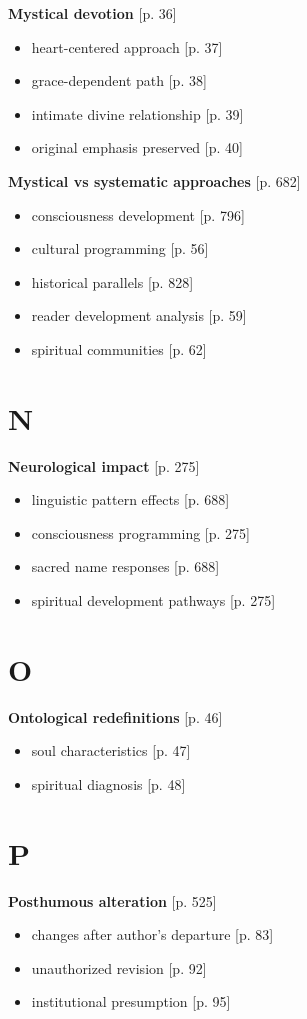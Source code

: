 \documentclass[11pt,twoside]{book}
\begin{document}
\textbf{\textbf{Mystical devotion}} {[}p. 36]
\begin{itemize}
\item heart-centered approach [p. 37]
\item grace-dependent path [p. 38]
\item intimate divine relationship [p. 39]
\item original emphasis preserved [p. 40]
\end{itemize}

\textbf{\textbf{Mystical vs systematic approaches}} {[}p. 682]
\begin{itemize}
\item consciousness development [p. 796]
\item cultural programming [p. 56]
\item historical parallels [p. 828]
\item reader development analysis [p. 59]
\item spiritual communities [p. 62]
\end{itemize}
\section*{N}
\label{sec:orgf26cce1}

\textbf{\textbf{Neurological impact}} {[}p. 275]
\begin{itemize}
\item linguistic pattern effects [p. 688]
\item consciousness programming [p. 275]
\item sacred name responses [p. 688]
\item spiritual development pathways [p. 275]
\end{itemize}
\section*{O}
\label{sec:orgcc0698b}

\textbf{\textbf{Ontological redefinitions}} {[}p. 46]
\begin{itemize}
\item soul characteristics [p. 47]
\item spiritual diagnosis [p. 48]
\end{itemize}
\section*{P}
\label{sec:org9b18693}

\textbf{\textbf{Posthumous alteration}} {[}p. 525]
\begin{itemize}
\item changes after author's departure [p. 83]
\item unauthorized revision [p. 92]
\item institutional presumption [p. 95]
\end{itemize}
\end{document}
